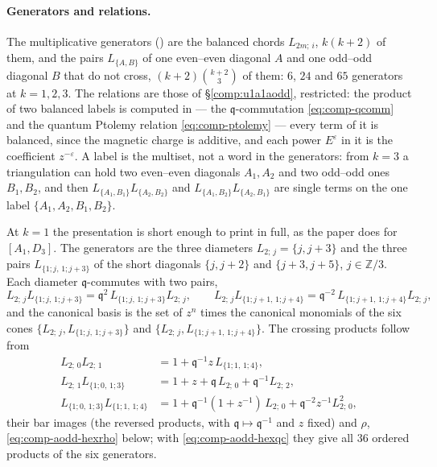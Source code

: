 \documentclass[11pt]{amsart}
\newcommand\fq{\mathfrak{q}}
\newcommand\bZ{\mathbb{Z}}
\theoremstyle{remark}
\begin{document}
\paragraph{Generators and relations.}  The multiplicative generators
() are the balanced chords $L_{2m;\,i}$, $k(k+2)$ of
them, and the pairs $L_{\{A,B\}}$ of one even--even diagonal $A$ and one
odd--odd diagonal $B$ that do not cross, $(k+2)\binom{k+2}{3}$ of them:
$6$, $24$ and $65$ generators at $k=1,2,3$.  The relations are those of
\S\ref{comp:u1a1aodd}, restricted: the product of two balanced labels is
computed in  --- the $\fq$-commutation
\eqref{eq:comp-qcomm} and the quantum Ptolemy relation
\eqref{eq:comp-ptolemy} --- every term of it is balanced, since the magnetic
charge is additive, and each power $E^{\varepsilon}$ in it is the coefficient
$z^{-\varepsilon}$.  A label is the multiset, not a word in the generators:
from $k=3$ a triangulation can hold two even--even diagonals $A_1,A_2$ and two
odd--odd ones $B_1,B_2$, and then $L_{\{A_1,B_1\}}L_{\{A_2,B_2\}}$ and
$L_{\{A_1,B_2\}}L_{\{A_2,B_1\}}$ are single terms on the one label
$\{A_1,A_2,B_1,B_2\}$.

At $k=1$ the presentation is short enough to print in full, as the paper does
for $[A_1,D_3]$.  The generators are the three diameters
$L_{2;\,j}=\{j,j+3\}$ and the three pairs $L_{\{1;j,\,1;j+3\}}$ of the short
diagonals $\{j,j+2\}$ and $\{j+3,j+5\}$, $j\in\bZ/3$.  Each diameter
$\fq$-commutes with two pairs,
\begin{equation}\label{eq:comp-aodd-hexqc}
  L_{2;\,j}L_{\{1;j,\,1;j+3\}}=\fq^{2}\,L_{\{1;j,\,1;j+3\}}L_{2;\,j},\qquad
  L_{2;\,j}L_{\{1;j+1,\,1;j+4\}}=\fq^{-2}\,L_{\{1;j+1,\,1;j+4\}}L_{2;\,j},
\end{equation}
and the canonical basis is the set of $z^n$ times the canonical monomials of
the six cones $\{L_{2;\,j},L_{\{1;j,\,1;j+3\}}\}$ and
$\{L_{2;\,j},L_{\{1;j+1,\,1;j+4\}}\}$.  The crossing products follow from
\begin{equation}\label{eq:comp-aodd-hex}
\begin{aligned}
  L_{2;\,0}L_{2;\,1}&=1+\fq^{-1}z\,L_{\{1;1,\,1;4\}},\\
  L_{2;\,1}L_{\{1;0,\,1;3\}}&=1+z+\fq\,L_{2;\,0}+\fq^{-1}L_{2;\,2},\\
  L_{\{1;0,\,1;3\}}L_{\{1;1,\,1;4\}}&=1+\fq^{-1}(1+z^{-1})\,L_{2;\,0}+\fq^{-2}z^{-1}L_{2;\,0}^{2},
\end{aligned}
\end{equation}
their bar images (the reversed products, with $\fq\mapsto\fq^{-1}$ and $z$
fixed) and $\rho$, \eqref{eq:comp-aodd-hexrho} below; with
\eqref{eq:comp-aodd-hexqc} they give all $36$ ordered products of the six
generators.
\end{document}
